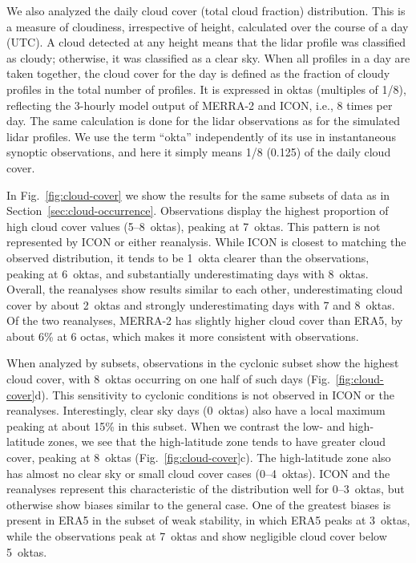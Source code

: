 \documentclass[draft]{agujournal2019}
\begin{document}
We also analyzed the daily cloud cover (total cloud fraction) distribution. This is a measure of cloudiness, irrespective of height, calculated over the course of a day (UTC). A cloud detected at any height means that the lidar profile was classified as cloudy; otherwise, it was classified as a clear sky. When all profiles in a day are taken together, the cloud cover for the day is defined as the fraction of cloudy profiles in the total number of profiles. It is expressed in oktas (multiples of 1/8), reflecting the 3-hourly model output of MERRA-2 and ICON, i.e., 8 times per day. The same calculation is done for the lidar observations as for the simulated lidar profiles. We use the term ``okta'' independently of its use in instantaneous synoptic observations, and here it simply means 1/8 (0.125) of the daily cloud cover.

In Fig.~\ref{fig:cloud-cover} we show the results for the same subsets of data as in Section~\ref{sec:cloud-occurrence}. Observations display the highest proportion of high cloud cover values (5--8~oktas), peaking at 7~oktas. This pattern is not represented by ICON or either reanalysis. While ICON is closest to matching the observed distribution, it tends to be 1~okta clearer than the observations, peaking at 6~oktas, and substantially underestimating days with 8~oktas. Overall, the reanalyses show results similar to each other, underestimating cloud cover by about 2~oktas and strongly underestimating days with 7 and 8~oktas. Of the two reanalyses, MERRA-2 has slightly higher cloud cover than ERA5, by about 6\% at 6 octas, which makes it more consistent with observations.

When analyzed by subsets, observations in the cyclonic subset show the highest cloud cover, with 8~oktas occurring on one half of such days (Fig.~\ref{fig:cloud-cover}d). This sensitivity to cyclonic conditions is not observed in ICON or the reanalyses. Interestingly, clear sky days (0~oktas) also have a local maximum peaking at about 15\% in this subset. When we contrast the low- and high-latitude zones, we see that the high-latitude zone tends to have greater cloud cover, peaking at 8~oktas (Fig.~\ref{fig:cloud-cover}c). The high-latitude zone also has almost no clear sky or small cloud cover cases (0--4~oktas). ICON and the reanalyses represent this characteristic of the distribution well for 0--3~oktas, but otherwise show biases similar to the general case. One of the greatest biases is present in ERA5 in the subset of weak stability, in which ERA5 peaks at 3~oktas, while the observations peak at 7~oktas and show negligible cloud cover below 5~oktas.
\end{document}
